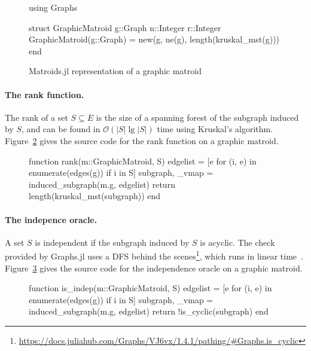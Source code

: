 \begin{figure}
\begin{jllisting}
using Graphs

struct GraphicMatroid
  g::Graph
  n::Integer
  r::Integer
  GraphicMatroid(g::Graph) = new(g, ne(g), length(kruskal_mst(g)))
end
\end{jllisting}
\caption{Matroids.jl representation of a graphic matroid}
\label{code:struct_graphicmatroid}
\end{figure}

\paragraph{The rank function.} The rank of a set $S\subseteq E$ is the size of a spanning forest of the subgraph induced by $S$, and can be found in $\mathcal{O}(|S| \lg |S|)$ time using Kruskal's algorithm. Figure~\ref{code:rank_graphic} gives the source code for the rank function on a graphic matroid.

\begin{figure}[ht!]
\begin{jllisting}
  function rank(m::GraphicMatroid, S)
  edgelist = [e for (i, e) in enumerate(edges(g)) if i in S]
  subgraph, _vmap = induced_subgraph(m.g, edgelist)
  return length(kruskal_mst(subgraph))
  end
\end{jllisting}
\caption{}
\label{code:rank_graphic}
\end{figure}
  
\paragraph{The indepence oracle.} A set $S$ is independent if the subgraph induced by $S$ is acyclic. The  check provided by Graphs.jl uses a DFS behind the scenes\footnote{\href{https://docs.juliahub.com/Graphs/VJ6vx/1.4.1/pathing/\#Graphs.is\_cyclic}{https://docs.juliahub.com/Graphs/VJ6vx/1.4.1/pathing/\#Graphs.is\_cyclic}}, which runs in linear time~\cite{Cormen2009-zm}. Figure~\ref{code:indep_graphic} gives the source code for the independence oracle on a graphic matroid.

\begin{figure}[ht!]
\begin{jllisting}
function is_indep(m::GraphicMatroid, S)
  edgelist = [e for (i, e) in enumerate(edges(g)) if i in S]
  subgraph, _vmap = induced_subgraph(m.g, edgelist)
  return !is_cyclic(subgraph)
end
\end{jllisting}
\caption{}
\label{code:indep_graphic}
\end{figure}


